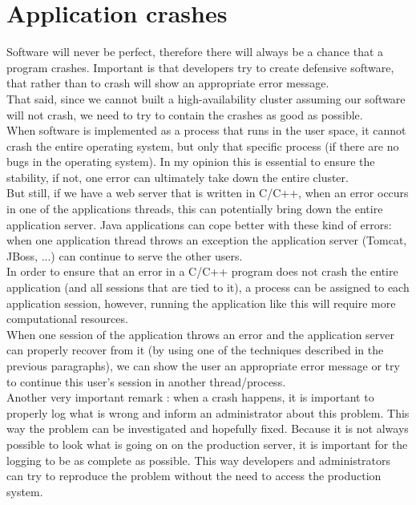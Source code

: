 \documentclass[12pt]{report}
\begin{document}
\section{Application crashes}
Software will never be perfect, therefore there will always be a
chance that a program crashes. Important is that developers try to
create defensive software, that rather than to crash will show an
appropriate error message.\\
That said, since we cannot built a high-availability cluster assuming
our software will not crash, we need to try to contain the crashes as
good as possible.\\
When software is implemented as a process that runs in the user space,
it cannot crash the entire operating system, but only that specific process (if
there are no bugs in the operating system). In my opinion this is
essential to ensure the stability, if not, one error can ultimately
take down the entire cluster.\\
But still, if we have a web server that is written in C/C++, when an
error occurs in one of the applications threads, this can potentially
bring down the entire application server. Java applications can cope
better with these kind of errors: when one application thread throws
an exception the application server (Tomcat, JBoss, ...) can continue
to serve the other users.\\ 
In order to ensure that an error in a  C/C++ program does not crash the entire
application (and all sessions that are tied to it),  a process can be
assigned to each application session, however, running the application
like this will require more computational resources.\\
When one session of the application throws an error and the
application server can properly recover from it (by using one of the
techniques described in the previous paragraphs), we can show the
user an appropriate error message or try to continue this user's
session in another thread/process.\\
Another very important remark : when a crash happens, it is important
to properly log what is wrong and inform an administrator about this
problem. This way the problem can be investigated and hopefully
fixed. 
Because it is not always possible to look what is
going on on the production server, it is important for the logging to
be as complete as possible. This way developers and administrators can try to
reproduce the problem without the need to access the production system.
\end{document}

